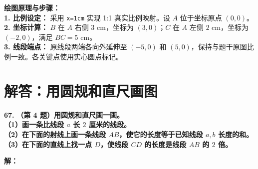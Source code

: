\documentclass[12pt, a4paper]{ctexrep}
\begin{document}
\vspace{0.6cm}

\begin{center}
\end{center}

\vspace{0.4cm}
{\small\color{blue!70!black}
\textbf{绘图原理与步骤：}\\
\textbf{1. 比例设定：} 采用 \texttt{x=1cm} 实现 1:1 真实比例映射。设 $A$ 位于坐标原点 $(0,0)$。\\
\textbf{2. 坐标计算：} $B$ 在 $A$ 右侧 $3$ cm，坐标为 $(3,0)$；$C$ 在 $A$ 左侧 $2$ cm，坐标为 $(-2,0)$，满足 $BC = 5$ cm。\\
\textbf{3. 线段端点：} 原线段两端各向外延伸至 $(-5,0)$ 和 $(5,0)$，保持与题干原图比例一致。各关键点使用实心圆点标记。
}

\newpage

\section{解答：用圆规和直尺画图}

\vspace{0.6cm}

\textbf{\LARGE 67.} \textbf{（第 4 题）用圆规和直尺画一画。\\[1.5ex]
（1）画一条比线段 $a$ 长 $2$ 厘米的线段。\\[1ex]
（2）在下面的射线上画一条线段 $AB$，使它的长度等于已知线段 $a, b$ 长度的和。\\[1ex]
（3）在下面的直线上找一点 $D$，使线段 $CD$ 的长度是线段 $AB$ 的 $2$ 倍。}

\vspace{0.4cm}
\textbf{解：}
\end{document}

